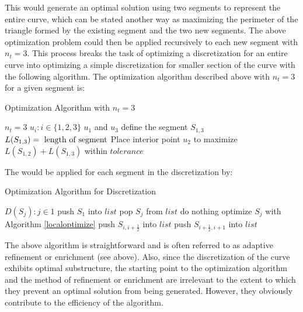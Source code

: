 This would generate an optimal solution using two segments to represent 
the entire curve, which can be stated another way as maximizing the 
perimeter of the triangle formed by the existing segment and the two new 
segments. 
The above optimization problem could then be applied recursively to each 
new segment with $n_t=3$. This process breaks the task of optimizing a 
discretization for an entire curve into optimizing a simple discretization 
for smaller section of the curve with the following algorithm. The 
optimization algorithm described above with $n_t=3$ for a given segment 
is:
\begin{algorithm}
\caption{Optimization Algorithm with $n_t=3$}\label{localoptimize}
\begin{algorithmic}[1]
\State $n_t = 3$
\State $u_i : i \in \{1,2,3\}$
\State $u_1 $ and $u_3$ define the segment $S_{1,3}$
  \State $L(S_{1,3}) =\textnormal{ length of segment}$
  \State Place interior point $u_2$ to maximize $L(S_{1,2})+L(S_{1,3})$ within $tolerance$
\EndProcedure
\end{algorithmic}
\end{algorithm}

The would be applied for each segment in the discretization by:

\begin{algorithm}
\caption{Optimization Algorithm for Discretization}
\begin{algorithmic}
  \State $D(S_j) : j \in {1}$
  \State push $S_1$ into $list$ 
    \State pop $S_j$ from $list$
      \State do nothing
    \Else
      \State optimize $S_j$ with Algorithm \ref{localoptimize}
      \State push $S_{i,i+\frac{1}{2}}$ into $list$
      \State push $S_{i+\frac{1}{2},i+1}$ into $list$
    \EndIf
  \EndWhile
\end{algorithmic}
\end{algorithm}

The above algorithm is straightforward and is often referred to as 
adaptive refinement or enrichment (see above). Also, since the 
discretization of the curve exhibits optimal substructure, the starting 
point to the optimization algorithm and the method of refinement or 
enrichment are irrelevant to the extent to which they prevent an optimal 
solution from being generated. However, they obviously contribute 
to the efficiency of the algorithm.

